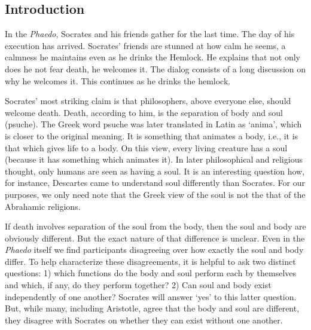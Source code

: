\documentclass[oneside]{article}
\begin{document}
\thispagestyle{fancy}

\subsection*{Introduction}\label{introduction}
In the \emph{Phaedo}, Socrates and his friends gather for the last time. The day of his execution has arrived. Socrates' friends are stunned at how calm he seems, a calmness he maintains even as he drinks the Hemlock.  He explains that not only does he not fear death, he welcomes it. The dialog consists of a long discussion on why he welcomes it. This continues as he drinks the hemlock. 

Socrates' most striking claim is that philosophers, above everyone else,  should welcome
death. Death, according to him, is the separation of body and soul (psuche).
The Greek word psuche was later translated in Latin as `anima', which is closer
to the original meaning. It is something that animates a body, i.e., it
is that which gives life to a body. On this view, every living creature has a
soul (because it has something which animates it). In later philosophical and religious thought, only humans are seen as having a soul. It is an interesting question how, for instance, Descartes came to understand soul differently than Socrates. For our purposes, we only need note that the Greek view of the soul is not the that of the Abrahamic religions. 

If death involves separation of the soul from the body, then the soul and body are obviously different. But the exact nature of that difference is unclear. Even in the \emph{Phaedo} itself we find participants disagreeing over how exactly the soul and body differ. To help characterize these disagreements, it is helpful to ask two distinct questions: 1) which functions do the body and soul perform each by themselves and which, if any, do they perform together? 2) Can soul and body exist independently of one another? Socrates will answer `yes' to this latter question. But, while many, including Aristotle, agree that the body and soul are different, they disagree with Socrates on whether they can exist without one another. 
\end{document}
